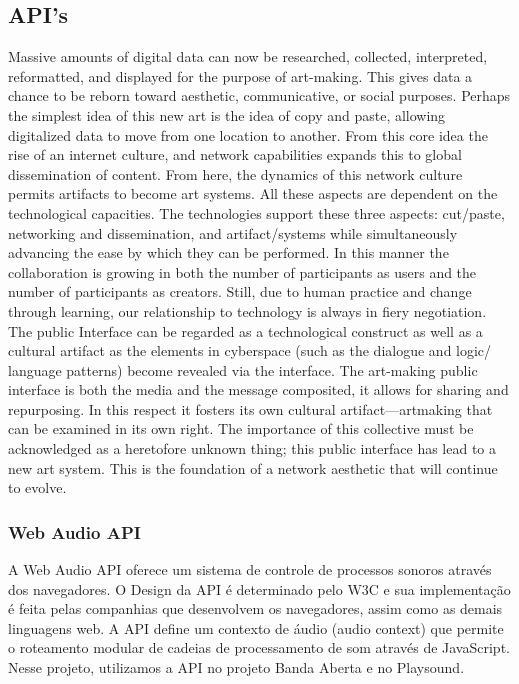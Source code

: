 
\subsection{API's}
\begin{citacao}
Massive amounts of digital data can now be researched, collected, interpreted, reformatted, and displayed for the purpose of art-making. This gives data a chance to be reborn toward aesthetic, communicative, or social purposes. Perhaps the simplest idea of this new art is the idea of copy and paste, allowing digitalized data to move from one location to another. From this core idea the rise of an internet culture, and network capabilities expands this to global dissemination of content. From here, the dynamics of this network culture permits artifacts to become art systems. All these aspects are dependent on the technological capacities. The technologies support these three aspects: cut/paste, networking and dissemination, and artifact/systems while simultaneously advancing the ease by which they can be performed. In this manner the collaboration is growing in both the number of participants as users and the number of participants as creators. Still, due to human practice and change through learning, our relationship to technology is always in fiery negotiation. The public Interface can be regarded as a technological construct as well as a cultural artifact as the elements in cyberspace (such as the dialogue and logic/ language patterns) become revealed via the interface. The art-making public interface is both the media and the message composited, it allows for sharing and repurposing. In this respect it fosters its own cultural artifact—artmaking that can be examined in its own right. The importance of this collective must be acknowledged as a heretofore unknown thing; this public interface has lead to a new art system. This is the foundation of a network aesthetic that will continue to evolve.
\cite[5]{Soon2011}
\end{citacao}

\subsubsection{Web Audio API}
A Web Audio API oferece um sistema de controle de processos sonoros através dos navegadores. O Design da API é determinado pelo W3C e sua implementação é feita pelas companhias que desenvolvem os navegadores, assim como as demais linguagens web. A API define um contexto de áudio (audio context) que permite o roteamento modular de cadeias de processamento de som através de JavaScript. Nesse projeto, utilizamos a API no projeto Banda Aberta e no Playsound. 

